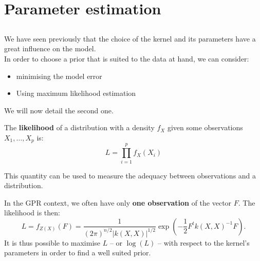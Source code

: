 \section[Param. estim.]{Parameter estimation}
\subsection{}

\begin{frame}{}
We have seen previously that the choice of the kernel and its parameters have a great influence on the model. \\ \vspace{5mm}
In order to choose a prior that is suited to the data at hand, we can consider:
\begin{itemize}
	\item minimising the model error
	\item Using maximum likelihood estimation
\end{itemize}
We will now detail the second one.
\end{frame}

\begin{frame}{}
\begin{definition}
The \textbf{likelihood} of a distribution with a density $f_X$ given some observations $X_1, \dots,X_p$ is:
\begin{equation*}
 	L = \prod_{i=1}^p f_X(X_i)
\end{equation*}
\end{definition}
This quantity can be used to measure the adequacy between observations and a distribution.\\ \vspace{3mm}
\end{frame}

\begin{frame}{}
In the GPR context, we often have only \textbf{one observation} of the vector $F$. The likelihood is then:
\begin{equation*}
 	L = f_{Z(X)}(F) = \frac{1}{\displaystyle (2 \pi)^{n/2} |k(X,X)|^{1/2}} \exp \left(-\frac12 F^t k(X,X)^{-1} F  \right).
\end{equation*}
It is thus possible to maximise $L$ -- or $\log(L)$ -- with respect to the kernel's parameters in order to find a well suited prior.
\end{frame}

